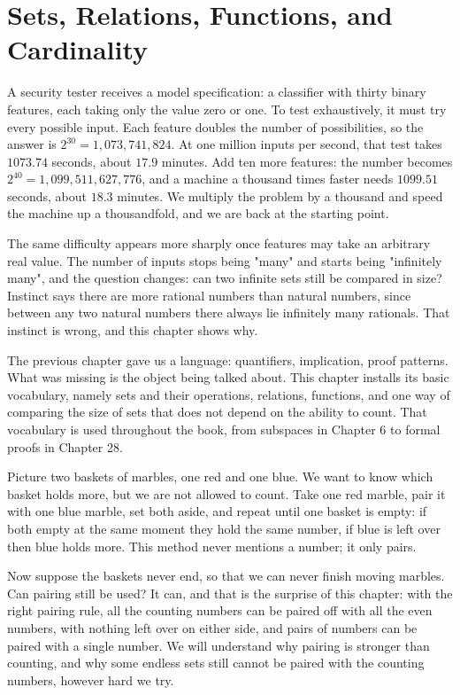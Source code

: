 \chapter{Sets, Relations, Functions, and Cardinality}

A security tester receives a model specification: a classifier with thirty binary
features, each taking only the value zero or one. To test exhaustively, it must try
every possible input. Each feature doubles the number of possibilities, so the answer
is $2^{30} = 1{,}073{,}741{,}824$. At one million inputs per second, that test takes
$1073.74$ seconds, about $17.9$ minutes. Add ten more features: the number becomes
$2^{40} = 1{,}099{,}511{,}627{,}776$, and a machine a thousand times faster needs
$1099.51$ seconds, about $18.3$ minutes. We multiply the problem by a thousand and
speed the machine up a thousandfold, and we are back at the starting point.

The same difficulty appears more sharply once features may take an arbitrary real
value. The number of inputs stops being "many" and starts being "infinitely many",
and the question changes: can two infinite sets still be compared in size? Instinct
says there are more rational numbers than natural numbers, since between any two
natural numbers there always lie infinitely many rationals. That instinct is wrong,
and this chapter shows why.

The previous chapter gave us a language: quantifiers, implication, proof patterns.
What was missing is the object being talked about. This chapter installs its basic
vocabulary, namely sets and their operations, relations, functions, and one way of
comparing the size of sets that does not depend on the ability to count. That
vocabulary is used throughout the book, from subspaces in Chapter 6 to formal proofs
in Chapter 28.

\begin{untukanak}
Picture two baskets of marbles, one red and one blue. We want to know which basket
holds more, but we are not allowed to count. Take one red marble, pair it with one
blue marble, set both aside, and repeat until one basket is empty: if both empty at
the same moment they hold the same number, if blue is left over then blue holds more.
This method never mentions a number; it only pairs.

Now suppose the baskets never end, so that we can never finish moving marbles. Can
pairing still be used? It can, and that is the surprise of this chapter: with the
right pairing rule, all the counting numbers can be paired off with all the even
numbers, with nothing left over on either side, and pairs of numbers can be paired
with a single number. We will understand why pairing is stronger than counting, and
why some endless sets still cannot be paired with the counting numbers, however hard
we try.
\end{untukanak}

